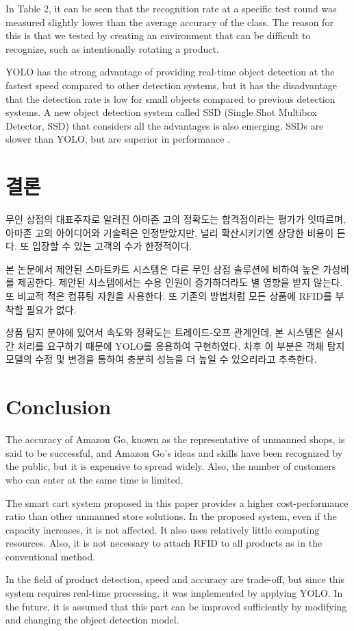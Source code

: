 \documentclass[smallextended]{svjour3}       %
\begin{document}
In Table 2, it can be seen that the recognition rate at a specific test
round was measured slightly lower than the average accuracy of the
class. The reason for this is that we tested by creating an environment
that can be difficult to recognize, such as intentionally rotating a
product.

YOLO has the strong advantage of providing real-time object detection at
the fastest speed compared to other detection systems, but it has the
disadvantage that the detection rate is low for small objects compared
to previous detection systems. A new object detection system called SSD
(Single Shot Multibox Detector, SSD) that considers all the advantages
is also emerging. SSDs are slower than YOLO, but are superior in
performance \cite{ren2015faster, liu2016ssd}.

\hypertarget{uxacb0uxb860}{%
\section{결론}\label{uxacb0uxb860}}

무인 상점의 대표주자로 알려진 아마존 고의 정확도는 합격점이라는 평가가
잇따르며, 아마존 고의 아이디어와 기술력은 인정받았지만, 널리
확산시키기엔 상당한 비용이 든다. 또 입장할 수 있는 고객의 수가
한정적이다.

본 논문에서 제안된 스마트카트 시스템은 다른 무인 상점 솔루션에 비하여
높은 가성비를 제공한다. 제안된 시스템에서는 수용 인원이 증가하더라도 별
영향을 받지 않는다. 또 비교적 적은 컴퓨팅 자원을 사용한다. 또 기존의
방법처럼 모든 상품에 RFID를 부착할 필요가 없다.

상품 탐지 분야에 있어서 속도와 정확도는 트레이드-오프 관계인데, 본
시스템은 실시간 처리를 요구하기 때문에 YOLO를 응용하여 구현하였다. 차후
이 부분은 객체 탐지 모델의 수정 및 변경을 통하여 충분히 성능을 더 높일
수 있으리라고 추측한다.

\hypertarget{conclusion}{%
\section{Conclusion}\label{conclusion}}

The accuracy of Amazon Go, known as the representative of unmanned
shops, is said to be successful, and Amazon Go's ideas and skills have
been recognized by the public, but it is expensive to spread widely.
Also, the number of customers who can enter at the same time is limited.

The smart cart system proposed in this paper provides a higher
cost-performance ratio than other unmanned store solutions. In the
proposed system, even if the capacity increases, it is not affected. It
also uses relatively little computing resources. Also, it is not
necessary to attach RFID to all products as in the conventional method.

In the field of product detection, speed and accuracy are trade-off, but
since this system requires real-time processing, it was implemented by
applying YOLO. In the future, it is assumed that this part can be
improved sufficiently by modifying and changing the object detection
model.



\end{document}
